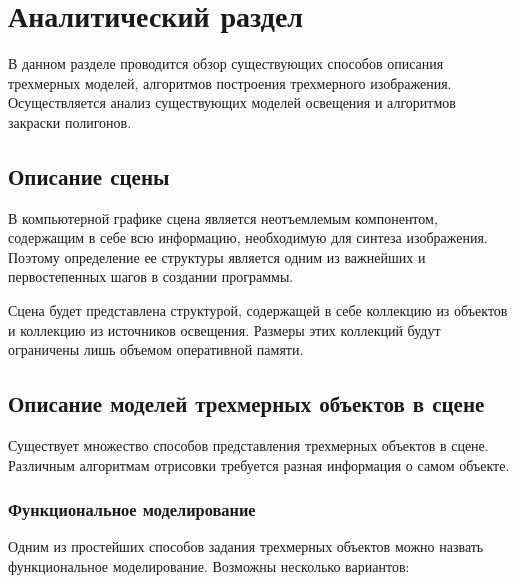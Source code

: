 \chapter{Аналитический раздел}

В данном разделе проводится обзор существующих способов описания трехмерных моделей, алгоритмов построения трехмерного изображения. Осуществляется анализ существующих моделей освещения и алгоритмов закраски полигонов.

\section{Описание сцены}

В компьютерной графике сцена является неотъемлемым компонентом, содержащим в себе всю информацию, необходимую для синтеза изображения. Поэтому определение ее структуры является одним из важнейших и первостепенных шагов в создании программы.

Сцена будет представлена структурой, содержащей в себе коллекцию из объектов и коллекцию из источников освещения. Размеры этих коллекций будут ограничены лишь объемом оперативной памяти.

\section{Описание моделей трехмерных объектов в сцене}

Существует множество способов представления трехмерных объектов в сцене. Различным алгоритмам отрисовки требуется разная информация о самом объекте.

\subsection{Функциональное моделирование}

Одним из простейших способов задания трехмерных объектов можно назвать функциональное моделирование. Возможны несколько вариантов:

